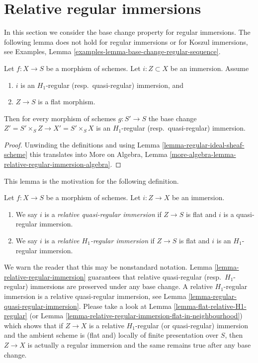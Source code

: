 \section{Relative regular immersions}
\label{section-relative-regular-immersion}

\noindent
In this section we consider the base change property for regular immersions.
The following lemma does not hold for regular immersions
or for Koszul immersions, see
Examples, Lemma \ref{examples-lemma-base-change-regular-sequence}.

\begin{lemma}
\label{lemma-relative-regular-immersion}
Let $f : X \to S$ be a morphism of schemes.
Let $i : Z \subset X$ be an immersion.
Assume
\begin{enumerate}
\item $i$ is an $H_1$-regular (resp.\ quasi-regular) immersion, and
\item $Z \to S$ is a flat morphism.
\end{enumerate}
Then for every morphism of schemes $g : S' \to S$ the base change
$Z' = S' \times_S Z \to X' = S' \times_S X$
is an $H_1$-regular (resp.\ quasi-regular) immersion.
\end{lemma}

\begin{proof}
Unwinding the definitions and using
Lemma \ref{lemma-regular-ideal-sheaf-scheme}
this translates into More on Algebra, Lemma
\ref{more-algebra-lemma-relative-regular-immersion-algebra}.
\end{proof}

\noindent
This lemma is the motivation for the following definition.

\begin{definition}
\label{definition-relative-H1-regular-immersion}
Let $f : X \to S$ be a morphism of schemes.
Let $i : Z \to X$ be an immersion.
\begin{enumerate}
\item We say $i$ is a {\it relative quasi-regular immersion}
if $Z \to S$ is flat and $i$ is a quasi-regular immersion.
\item We say $i$ is a {\it relative $H_1$-regular immersion}
if $Z \to S$ is flat and $i$ is an $H_1$-regular immersion.
\end{enumerate}
\end{definition}

\noindent
We warn the reader that this may be nonstandard notation.
Lemma \ref{lemma-relative-regular-immersion}
guarantees that relative quasi-regular (resp.\ $H_1$-regular)
immersions are preserved under any base change.
A relative $H_1$-regular immersion is a relative quasi-regular immersion, see
Lemma \ref{lemma-regular-quasi-regular-immersion}.
Please take a look at
Lemma \ref{lemma-flat-relative-H1-regular}
(or
Lemma \ref{lemma-relative-regular-immersion-flat-in-neighbourhood})
which shows that if $Z \to X$ is a relative $H_1$-regular
(or quasi-regular) immersion and the ambient scheme is (flat and)
locally of finite presentation over $S$, then $Z \to X$
is actually a regular immersion and the same remains true after
any base change.


